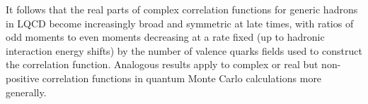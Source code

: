 It follows that the real parts of complex correlation functions for generic hadrons in LQCD become increasingly broad and symmetric at late times, with ratios of odd moments to even moments decreasing at a rate fixed (up to hadronic interaction energy shifts) by the number of valence quarks fields used to construct the correlation function.
Analogous results apply to complex or real but non-positive correlation functions in quantum Monte Carlo calculations more generally.

%
%
